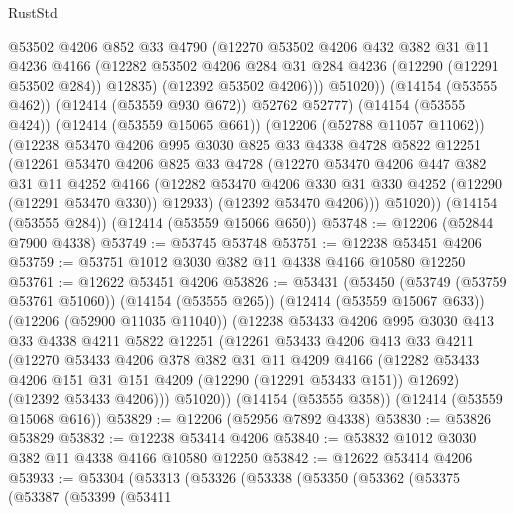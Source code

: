 \begin{lexlean}{RustStd}
\begin{coremodule}
              @53502
              @4206
              @852
              @33
              @4790
              (@12270
                @53502
                @4206
                @432
                @382
                @31
                @11
                @4236
                @4166
                (@12282 @53502 @4206 @284 @31 @284 @4236 (@12290 (@12291 @53502 @284)) @12835)
                (@12392 @53502 @4206)))
            @51020))
        (@14154 (@53555 @462))
        (@12414 (@53559 @930 @672))
        @52762
        @52777)
      (@14154 (@53555 @424))
      (@12414 (@53559 @15065 @661))
      (@12206 (@52788 @11057 @11062))
      (@12238
        @53470
        @4206
        @995
        @3030
        @825
        @33
        @4338
        @4728
        @5822
        @12251
        (@12261
          @53470
          @4206
          @825
          @33
          @4728
          (@12270
            @53470
            @4206
            @447
            @382
            @31
            @11
            @4252
            @4166
            (@12282 @53470 @4206 @330 @31 @330 @4252 (@12290 (@12291 @53470 @330)) @12933)
            (@12392 @53470 @4206)))
        @51020))
    (@14154 (@53555 @284))
    (@12414 (@53559 @15066 @650))
@53748 := @12206 (@52844 @7900 @4338)
@53749 := @53745 @53748
@53751 := @12238 @53451 @4206
@53759 := @53751 @1012 @3030 @382 @11 @4338 @4166 @10580 @12250
@53761 := @12622 @53451 @4206
@53826 := @53431
    (@53450
      (@53749 (@53759 @53761 @51060))
      (@14154 (@53555 @265))
      (@12414 (@53559 @15067 @633))
      (@12206 (@52900 @11035 @11040))
      (@12238
        @53433
        @4206
        @995
        @3030
        @413
        @33
        @4338
        @4211
        @5822
        @12251
        (@12261
          @53433
          @4206
          @413
          @33
          @4211
          (@12270
            @53433
            @4206
            @378
            @382
            @31
            @11
            @4209
            @4166
            (@12282 @53433 @4206 @151 @31 @151 @4209 (@12290 (@12291 @53433 @151)) @12692)
            (@12392 @53433 @4206)))
        @51020))
    (@14154 (@53555 @358))
    (@12414 (@53559 @15068 @616))
@53829 := @12206 (@52956 @7892 @4338)
@53830 := @53826 @53829
@53832 := @12238 @53414 @4206
@53840 := @53832 @1012 @3030 @382 @11 @4338 @4166 @10580 @12250
@53842 := @12622 @53414 @4206
@53933 := @53304
    (@53313
      (@53326
        (@53338
          (@53350
            (@53362
              (@53375
                (@53387
                  (@53399
                    (@53411

\end{coremodule}
\end{lexlean}

